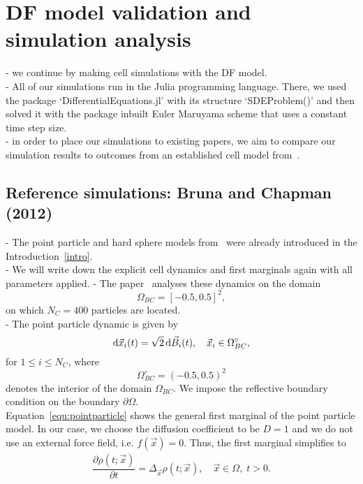 \section{DF model validation and simulation analysis} \label{sanitycheck}
- we continue by making cell simulations with the DF model. \\
- All of our simulations run in the Julia programming language. 
There, we used the package `DifferentialEquations.jl' with its structure `SDEProblem()' and then solved it with the package inbuilt Euler Maruyama scheme that uses a constant time step size. \\
- in order to place our simulations to existing papers, we aim to compare our simulation results to outcomes from an established cell model from~\cite{Bruna2012}. \\

\subsection{Reference simulations: Bruna and Chapman (2012)}
- The point particle and hard sphere models from~\cite{Bruna2012} were already introduced in the Introduction~\ref{intro}. \\
- We will write down the explicit cell dynamics and first marginals again with all parameters applied.
- The paper~\cite{Bruna2012} analyses these dynamics on the domain 
\[\Omega_{BC} = [-0.5, 0.5]^2,\]
on which $N_{C} = 400$ particles are located. \\

- The point particle dynamic is given by
\begin{equation*}
    \mathrm{d} \vec{x}_i(t) = \sqrt{2} \, \mathrm{d} \vec{B}_i(t), \quad \vec{x}_i \in \Omega_{BC}^{\circ},
\end{equation*}
for $1 \leq i \leq N_C$, where 
\[
    \Omega_{BC}^{\circ} = (-0.5, 0.5)^2
\]
denotes the interior of the domain $\Omega_{BC}$. 
We impose the reflective boundary condition on the boundary $\partial \Omega$. \\ 
Equation~\eqref{equ:pointparticle} shows the general first marginal of the point particle model.
In our case, we choose the diffusion coefficient to be $D = 1$ and we do not use an external force field, i.e. $f(\vec{x}) = 0$.
Thus, the first marginal simplifies to
\begin{align}
	\dfrac{\partial \rho (t; \vec{x})}{\partial t} = \Delta_{\vec{x}} \rho(t; \vec{x}) , \quad \vec{x} \in \Omega, \; t>0.
    \label{equ:marginalPP}
\end{align}




